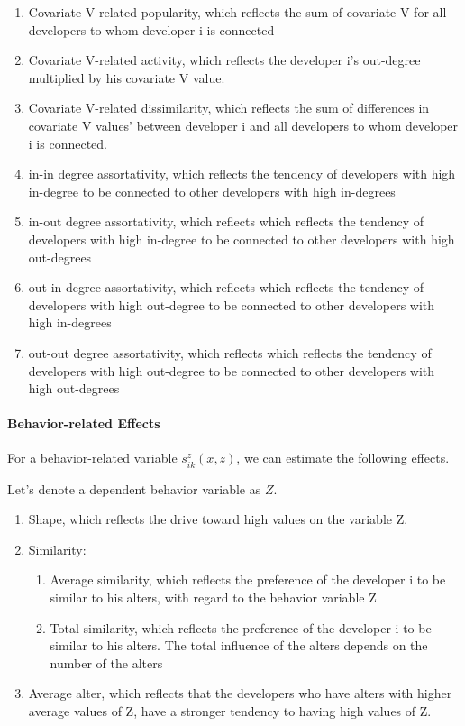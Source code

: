 \documentclass[11pt]{report}
\begin{document}
\begin{enumerate}
\item{Covariate V-related popularity, which reflects the sum of covariate V for all developers to whom developer i is connected}
\item{Covariate V-related activity, which reflects the developer i's out-degree multiplied by his covariate V value.}
\item{Covariate V-related dissimilarity, which reflects the sum of differences in covariate V values' between developer i and all developers to whom developer i is connected.}
\item{in-in degree assortativity, which reflects the tendency of developers with high in-degree to be connected to other developers with high in-degrees}
\item{in-out degree assortativity, which reflects which reflects the tendency of developers with high in-degree to be connected to other developers with high out-degrees}
\item{out-in degree assortativity, which reflects which reflects the tendency of developers with high out-degree to be connected to other developers with high in-degrees}
\item{out-out degree assortativity, which reflects which reflects the tendency of developers with high out-degree to be connected to other developers with high out-degrees}
\end{enumerate}

\paragraph{Behavior-related Effects\\}
For a behavior-related variable $s_{ik}^z(x,z)$, we can estimate the following effects.

Let's denote a dependent behavior variable as $Z$.
\begin{enumerate}
\item{Shape, which reflects the drive toward high values on the variable Z.}
\item{Similarity:}
\begin{enumerate}
\item{Average similarity, which reflects the preference of the developer i to be similar to his alters, with regard to the behavior variable Z}
\item{Total similarity, which reflects the preference of the developer i to be similar to his alters. The total influence of the alters depends on the number of the alters}
\end{enumerate}
\item{Average alter, which reflects that the developers who have alters with higher average values of Z, have a stronger tendency to having high values of Z.}
\end{enumerate}
\end{document}
